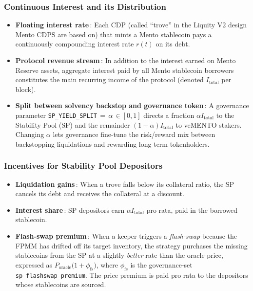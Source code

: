 \documentclass[a4paper]{article}
\providecommand{\hyp}{-}
\theoremstyle{definition}
\begin{document}
\subsubsection*{Continuous Interest and its Distribution}
\begin{itemize}
  \item \textbf{Floating interest rate}\,:  Each CDP (called ``trove'' in the Liquity V2 design Mento CDPS are based on) that mints a Mento stablecoin pays a continuously compounding interest rate $r(t)$ on its debt.
  \item \textbf{Protocol revenue stream}\,:  In addition to the interest earned on Mento Reserve assets, aggregate interest paid by all Mento stablecoin borrowers constitutes the main recurring income of the protocol (denoted $I_{\mathrm{total}}$ per block).
  \item \textbf{Split between solvency backstop and governance token}\,:  A governance parameter \texttt{SP\_YIELD\_SPLIT}\,$=\,\alpha\,\in[0,1]$ directs a fraction $\alpha I_{\mathrm{total}}$ to the Stability Pool (SP) and the remainder $(1-\alpha) I_{\mathrm{total}}$ to veMENTO stakers.  Changing $\alpha$ lets governance fine\hyp tune the risk/reward mix between backstopping liquidations and rewarding long\hyp term tokenholders.
\end{itemize}

\subsubsection*{Incentives for Stability Pool Depositors}
\begin{itemize}
  \item \textbf{Liquidation gains}\,:  When a trove falls below its collateral ratio, the SP cancels its debt and receives the collateral at a discount.
  \item \textbf{Interest share}\,:  SP depositors earn $\alpha I_{\mathrm{total}}$ pro rata, paid in the borrowed stablecoin.
  \item \textbf{Flash\hyp swap premium}\,:  When a keeper triggers a \emph{flash\hyp swap} because the FPMM has drifted off its target inventory, the strategy purchases the missing stablecoins from the SP at a slightly \emph{better} rate than the oracle price, expressed as $P_{\mathrm{oracle}}\bigl(1+\phi_{\mathrm{fs}}\bigr)$, where $\phi_{\mathrm{fs}}$ is the governance\hyp set \texttt{sp\_flashswap\_premium}.  The price premium is paid pro rata to the depositors whose stablecoins are sourced.
\end{itemize}
\end{document}

